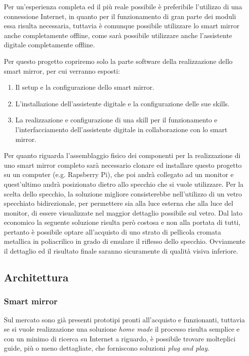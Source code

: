 \documentclass[12pt,a4paper]{article}
\begin{document}
Per un'esperienza completa ed il pi\`u reale possibile \`e preferibile l'utilizzo di una connessione Internet,
in quanto per il funzionamento di gran parte dei moduli essa risulta necessaria, tuttavia \`e comunque possibile
utilizzare lo smart mirror anche completamente offline, come sar\`a possibile utilizzare anche l'assistente digitale
completamente offline.

Per questo progetto copriremo solo la parte software della realizzazione dello smart mirror, per cui verranno esposti:
\begin{enumerate}
  \item Il setup e la configurazione dello smart mirror.
  \item L'installazione dell'assistente digitale e la configurazione delle sue skills.
  \item La realizzazione e configurazione di una skill per il funzionamento e l'interfacciamento dell'assistente digitale
      in collaborazione con lo smart mirror.
\end{enumerate}

Per quanto riguarda l'assemblaggio fisico dei componenti per la realizzazione di uno smart mirror completo sar\`a
necessario clonare ed installare questo progetto su un computer (e.g. Rapsberry Pi), che poi andr\`a collegato
ad un monitor e quest'ultimo andr\`a posizionato dietro allo specchio che si vuole utilizzare. Per la scelta dello specchio,
la soluzione migliore consisterebbe nell'utilizzo di un vetro specchiato bidirezionale, per permettere sia alla luce esterna
che alla luce del monitor, di essere visualizzate nel maggior dettaglio possibile sul vetro. Dal lato economico la seguente soluzione
risulta per\`o costosa e non alla portata di tutti, pertanto \`e possibile optare all'acquisto di uno strato di pellicola
cromata metallica in poliacrilico in grado di emulare il riflesso dello specchio. Ovviamente il dettaglio ed il risultato
finale saranno sicuramente di qualit\`a visiva inferiore.

\subsection{Architettura}

\subsubsection{Smart mirror}\label{smartmirror}

Sul mercato sono gi\`a presenti prototipi pronti all'acquisto e funzionanti, tuttavia se si vuole realizzazione
una soluzione \textit{home made} il processo risulta semplice e con un minimo di ricerca su Internet a riguardo,
\`e possibile trovare molteplici guide, pi\`u o meno dettagliate, che forniscono soluzioni \textit{plug and play}.
\end{document}
